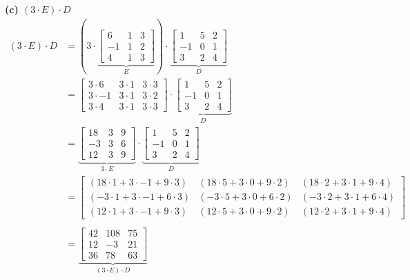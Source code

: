 \documentclass[a4paper,12pt]{article}
\begin{document}
\textbf{(c) $(3 \cdot E) \cdot D$}
\begin{align*}
    (3 \cdot E) \cdot D&= (3 \cdot
    \underbrace{
    \begin{bmatrix}
        6 & 1 & 3\\
        -1 & 1 & 2\\
        4 & 1 & 3
    \end{bmatrix}}_{E})
    \cdot
    \underbrace{
    \begin{bmatrix}
        1 & 5 & 2\\
        -1 & 0 & 1\\
        3 & 2 & 4
    \end{bmatrix}}_{D} \\
    &=
    \begin{bmatrix}
        3 \cdot 6 & 3 \cdot 1 & 3 \cdot 3\\
        3 \cdot -1 & 3 \cdot 1 & 3 \cdot 2\\
        3 \cdot 4 & 3 \cdot 1 & 3 \cdot 3
    \end{bmatrix}
    \cdot
    \underbrace{
    \begin{bmatrix}
        1 & 5 & 2\\
        -1 & 0 & 1\\
        3 & 2 & 4
    \end{bmatrix}}_{D} \\
    &=
    \underbrace{
    \begin{bmatrix}
        18 & 3 & 9\\
        -3 & 3 & 6\\
        12 & 3 & 9
    \end{bmatrix}}_{3 \cdot E}
    \cdot
    \underbrace{
    \begin{bmatrix}
        1 & 5 & 2\\
        -1 & 0 & 1\\
        3 & 2 & 4
    \end{bmatrix}}_{D} \\
    &=
    \begin{bmatrix}
        (18\cdot 1 + 3 \cdot -1 + 9 \cdot 3) & (18 \cdot 5 + 3 \cdot 0 + 9 \cdot 2) & (18 \cdot 2 + 3 \cdot 1 + 9 \cdot 4)\\
        (-3\cdot 1 + 3 \cdot -1 + 6 \cdot 3) & (-3 \cdot 5 + 3 \cdot 0 + 6 \cdot 2) & (-3 \cdot 2 + 3 \cdot 1 + 6 \cdot 4)\\
        (12\cdot 1 + 3 \cdot -1 + 9 \cdot 3) & (12 \cdot 5 + 3 \cdot 0 + 9 \cdot 2) & (12 \cdot 2 + 3 \cdot 1 + 9 \cdot 4)
    \end{bmatrix} \\ \\
    &=
    \underbrace{
    \begin{bmatrix}
        42 & 108 & 75\\
        12 & -3 & 21\\
        36 & 78 & 63
    \end{bmatrix}}_{(3 \cdot E) \cdot D} 
\end{align*}
\end{document}
